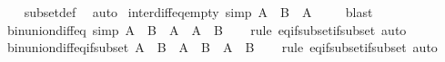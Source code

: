 \begin{isabellebody}
%
\isadelimproof
\ \ %
\endisadelimproof
%
\isatagproof
{}\isamarkupfalse%
\ subset{\isacharunderscore}{\kern0pt}def\ \isamarkupfalse%
\ auto%
\endisatagproof
{\isafoldproof}%
%
\isadelimproof
\isanewline
%
\endisadelimproof
\isanewline
{}\isamarkupfalse%
\ inter{\isacharunderscore}{\kern0pt}diff{\isacharunderscore}{\kern0pt}eq{\isacharunderscore}{\kern0pt}empty\ {\isacharbrackleft}{\kern0pt}simp{\isacharbrackright}{\kern0pt}{\isacharcolon}{\kern0pt}\ {\isachardoublequoteopen}A\ {\isasyminter}\ {\isacharparenleft}{\kern0pt}B\ {\isasymsetminus}\ A{\isacharparenright}{\kern0pt}\ {\isacharequal}{\kern0pt}\ {\isacharbraceleft}{\kern0pt}{\isacharbraceright}{\kern0pt}{\isachardoublequoteclose}%
\isadelimproof
\ %
\endisadelimproof
%
\isatagproof
{}\isamarkupfalse%
\ blast%
\endisatagproof
{\isafoldproof}%
%
\isadelimproof
%
\endisadelimproof
\isanewline
\isanewline
{}\isamarkupfalse%
\ bin{\isacharunderscore}{\kern0pt}union{\isacharunderscore}{\kern0pt}diff{\isacharunderscore}{\kern0pt}eq\ {\isacharbrackleft}{\kern0pt}simp{\isacharbrackright}{\kern0pt}{\isacharcolon}{\kern0pt}\ {\isachardoublequoteopen}A\ {\isasymunion}\ {\isacharparenleft}{\kern0pt}B\ {\isasymsetminus}\ A{\isacharparenright}{\kern0pt}\ {\isacharequal}{\kern0pt}\ A\ {\isasymunion}\ B{\isachardoublequoteclose}\isanewline
%
\isadelimproof
\ \ %
\endisadelimproof
%
\isatagproof
{}\isamarkupfalse%
\ {\isacharparenleft}{\kern0pt}rule\ eq{\isacharunderscore}{\kern0pt}if{\isacharunderscore}{\kern0pt}subset{\isacharunderscore}{\kern0pt}if{\isacharunderscore}{\kern0pt}subset{\isacharparenright}{\kern0pt}\ auto%
\endisatagproof
{\isafoldproof}%
%
\isadelimproof
\isanewline
%
\endisadelimproof
\isanewline
{}\isamarkupfalse%
\ bin{\isacharunderscore}{\kern0pt}union{\isacharunderscore}{\kern0pt}diff{\isacharunderscore}{\kern0pt}eq{\isacharunderscore}{\kern0pt}if{\isacharunderscore}{\kern0pt}subset{\isacharcolon}{\kern0pt}\ {\isachardoublequoteopen}A\ {\isasymsubseteq}\ B\ {\isasymLongrightarrow}\ A\ {\isasymunion}\ {\isacharparenleft}{\kern0pt}B\ {\isasymsetminus}\ A{\isacharparenright}{\kern0pt}\ {\isacharequal}{\kern0pt}\ B{\isachardoublequoteclose}\isanewline
%
\isadelimproof
\ \ %
\endisadelimproof
%
\isatagproof
{}\isamarkupfalse%
\ {\isacharparenleft}{\kern0pt}rule\ eq{\isacharunderscore}{\kern0pt}if{\isacharunderscore}{\kern0pt}subset{\isacharunderscore}{\kern0pt}if{\isacharunderscore}{\kern0pt}subset{\isacharparenright}{\kern0pt}\ auto%
\endisatagproof
{\isafoldproof}%
%
\isadelimproof

\end{isabellebody}
